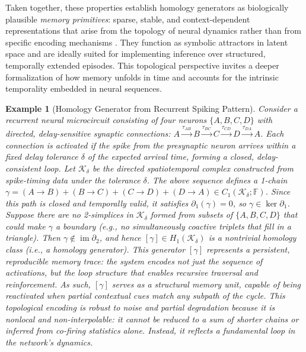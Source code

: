 \documentclass[lettersize,journal]{IEEEtran}
\newtheorem{example}{Example}
\begin{document}
Taken together, these properties establish homology generators as biologically plausible \emph{memory primitives}: sparse, stable, and context-dependent representations that arise from the topology of neural dynamics rather than from specific encoding mechanisms \cite{saggar2018towards}. They function as symbolic attractors in latent space and are ideally suited for implementing inference over structured, temporally extended episodes. This topological perspective invites a deeper formalization of how memory unfolds in time and accounts for the intrinsic temporality embedded in neural sequences. %
\begin{example}[Homology Generator from Recurrent Spiking Pattern]
Consider a recurrent neural microcircuit consisting of four neurons \( \{A, B, C, D\} \) with directed, delay-sensitive synaptic connections:
$A \xrightarrow{\tau_{AB}} B \xrightarrow{\tau_{BC}} C \xrightarrow{\tau_{CD}} D \xrightarrow{\tau_{DA}} A$.
Each connection is activated if the spike from the presynaptic neuron arrives within a fixed delay tolerance \( \delta \) of the expected arrival time, forming a closed, delay-consistent loop.
Let \( \mathcal{K}_\delta \) be the directed spatiotemporal complex constructed from spike-timing data under the tolerance \( \delta \). The above sequence defines a 1-chain
$\gamma = (A \rightarrow B) + (B \rightarrow C) + (C \rightarrow D) + (D \rightarrow A) \in C_1(\mathcal{K}_\delta; \mathbb{F})$.
Since this path is closed and temporally valid, it satisfies \( \partial_1(\gamma) = 0 \), so \( \gamma \in \ker \partial_1 \).
Suppose there are no 2-simplices in \( \mathcal{K}_\delta \) formed from subsets of \( \{A, B, C, D\} \) that could make \( \gamma \) a boundary (e.g., no simultaneously coactive triplets that fill in a triangle). Then \( \gamma \notin \operatorname{im} \partial_2 \), and hence
$[\gamma] \in H_1(\mathcal{K}_\delta)$
is a nontrivial homology class (i.e., a homology generator).
This generator \( [\gamma] \) represents a persistent, reproducible memory trace: the system encodes not just the sequence of activations, but the loop structure that enables recursive traversal and reinforcement. As such, \( [\gamma] \) serves as a structural memory unit, capable of being reactivated when partial contextual cues match any subpath of the cycle.
This topological encoding is robust to noise and partial degradation because it is nonlocal and non-interpolable: it cannot be reduced to a sum of shorter chains or inferred from co-firing statistics alone. Instead, it reflects a fundamental loop in the network’s dynamics.
\end{example}
\end{document}
